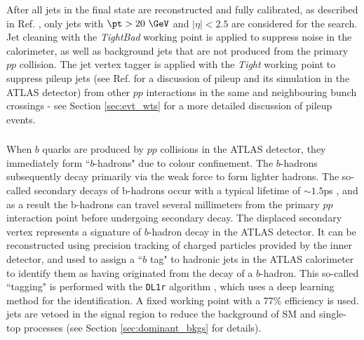 After all \smallR jets in the final state are reconstructed and fully calibrated, as described in Ref. \cite{ATLAS-CONF-2015-037}, only jets with \(\pt > 20~\GeV\) and \(|\eta| < 2.5\) are considered for the search. Jet cleaning \cite{ATLAS-CONF-2015-029} with the \emph{TightBad} working point is applied to suppress noise in the calorimeter, as well as background jets that are not produced from the primary \(pp\) collision. The jet vertex tagger \cite{ATLAS-CONF-2014-018} is applied with the \emph{Tight} working point to suppress pileup jets (see Ref. \cite{pileup} for a discussion of pileup and its simulation in the ATLAS detector) from other \(pp\) interactions in the same and neighbouring bunch crossings - see Section \ref{sec:evt_wts} for a more detailed discussion of pileup events. 

\subsubsection{\btag}
\label{sec:btag}

When \(b\) quarks are produced by \(pp\) collisions in the ATLAS detector, they immediately form ``\(b\)-hadrons" due to colour confinement. The \(b\)-hadrons subsequently decay primarily via the weak force to form lighter hadrons. The so-called secondary decays of b-hadrons occur with a typical lifetime of \(\sim 1.5\)ps \cite{pdg_2020}, and as a result the b-hadrons can travel several millimeters from the primary \(pp\) interaction point \cite{ATLAS-CONF-2018-006} before undergoing secondary decay. The displaced secondary vertex represents a signature of \(b\)-hadron decay in the ATLAS detector. It can be reconstructed using precision tracking of charged particles provided by the inner detector, and used to assign a ``\(b\) tag" to hadronic jets in the ATLAS calorimeter to identify them as having originated from the decay of a \(b\)-hadron. This so-called ``\bjet tagging" is performed with the \verb|DL1r| algorithm \cite{ATLAS-CONF-2018-006}, which uses a deep learning method for the identification. A fixed working point with a 77\% efficiency is used. \btagged jets are vetoed in the signal region to reduce the background of SM \ttbar and single-top processes (see Section \ref{sec:dominant_bkgs} for details).

